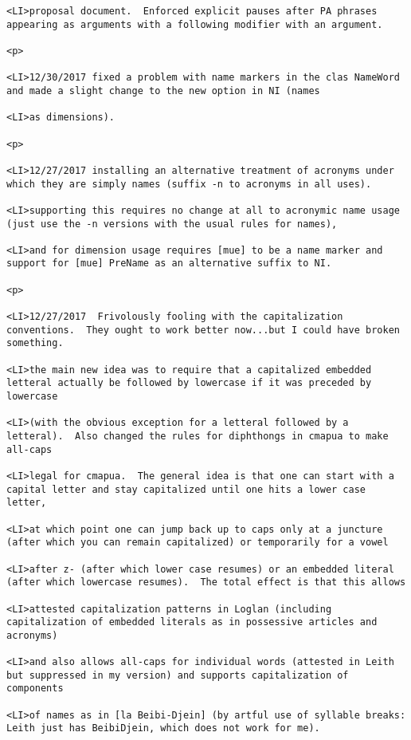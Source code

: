 \documentclass[12pt]{article}
\begin{document}
\begin{lstlisting}
<LI>proposal document.  Enforced explicit pauses after PA phrases appearing as arguments with a following modifier with an argument.

<p>

<LI>12/30/2017 fixed a problem with name markers in the clas NameWord and made a slight change to the new option in NI (names

<LI>as dimensions).

<p>

<LI>12/27/2017 installing an alternative treatment of acronyms under which they are simply names (suffix -n to acronyms in all uses).

<LI>supporting this requires no change at all to acronymic name usage (just use the -n versions with the usual rules for names),

<LI>and for dimension usage requires [mue] to be a name marker and support for [mue] PreName as an alternative suffix to NI.

<p>

<LI>12/27/2017  Frivolously fooling with the capitalization conventions.  They ought to work better now...but I could have broken something.

<LI>the main new idea was to require that a capitalized embedded letteral actually be followed by lowercase if it was preceded by lowercase

<LI>(with the obvious exception for a letteral followed by a letteral).  Also changed the rules for diphthongs in cmapua to make all-caps

<LI>legal for cmapua.  The general idea is that one can start with a capital letter and stay capitalized until one hits a lower case letter,

<LI>at which point one can jump back up to caps only at a juncture (after which you can remain capitalized) or temporarily for a vowel

<LI>after z- (after which lower case resumes) or an embedded literal (after which lowercase resumes).  The total effect is that this allows

<LI>attested capitalization patterns in Loglan (including capitalization of embedded literals as in possessive articles and acronyms)

<LI>and also allows all-caps for individual words (attested in Leith but suppressed in my version) and supports capitalization of components

<LI>of names as in [la Beibi-Djein] (by artful use of syllable breaks:  Leith just has BeibiDjein, which does not work for me).


\end{lstlisting}
\end{document}
